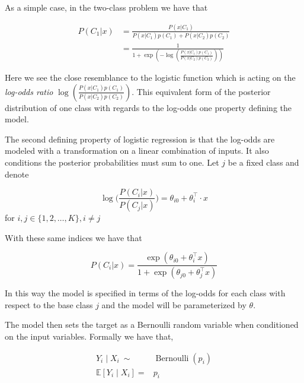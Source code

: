 As a simple case, in the two-class problem we have that


\begin{equation}
\begin{split}
P(C_1| x) & = \frac{P(x|C_1) }{P(x|C_1)p(C_1) + P(x|C_2)p(C_2)} \\
& = \frac{1 }
{1 + \exp(- \log(  \frac{ P(x|C_1)p(C_1)}
{P(x|C_2)p(C_2)
}))
}
\end{split}
\end{equation}

Here we see the close resemblance to the logistic function which is acting on the \textit{log-odds ratio} $ \log(  \frac{ P(x|C_1)p(C_1)}{P(x|C_2)p(C_2) })$. This equivalent form of the posterior distribution of one class with regards to the log-odds one property defining the model.



The second defining property of logistic regression is that the log-odds are modeled with a transformation on a linear combination of inputs. It also conditions the posterior probabilities must sum to one. Let $j$ be a fixed class and denote

\begin{equation}\label{logit-logOddss}
 \log\big( \frac{P(C_i|x)}{P(C_j|x)}\big) = \theta_{i0} + \theta_i^\intercal \cdot x
 \end{equation}  for $i,j \in \{1,2,\ldots,K\}, i\neq j$

With these same indices we have that

\begin{equation} P(C_i|x) = \frac{\exp(\theta_{i0} + \theta_i^\intercal x)}{1 + \exp(\theta_{j0} + \theta_j^\intercal x)}
\end{equation}

In this way the model is specified in terms of the log-odds for each class with respect to the base class $j$ and the model will be parameterized by $\theta$.

The model then sets the target as a Bernoulli random variable when conditioned on the input variables. Formally we have that,

\begin{equation}
\begin{split}
Y_i \mid X_i \ \sim & \operatorname{Bernoulli}(p_i) \\
\mathbb{E}[Y_i \mid X_i ] = & p_i
\end{split}
\end{equation}


